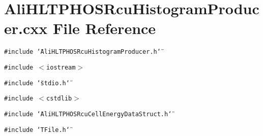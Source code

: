 \section{Ali\-HLTPHOSRcu\-Histogram\-Producer.cxx File Reference}
\label{AliHLTPHOSRcuHistogramProducer_8cxx}


{\tt \#include \char`\"{}Ali\-HLTPHOSRcu\-Histogram\-Producer.h\char`\"{}}\par
{\tt \#include $<$iostream$>$}\par
{\tt \#include \char`\"{}stdio.h\char`\"{}}\par
{\tt \#include $<$cstdlib$>$}\par
{\tt \#include \char`\"{}Ali\-HLTPHOSRcu\-Cell\-Energy\-Data\-Struct.h\char`\"{}}\par
{\tt \#include \char`\"{}TFile.h\char`\"{}}\par
